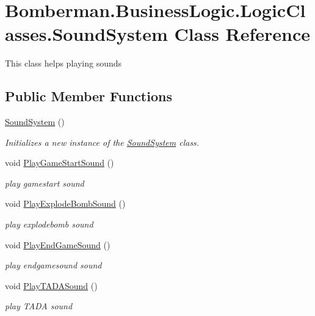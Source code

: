 \hypertarget{class_bomberman_1_1_business_logic_1_1_logic_classes_1_1_sound_system}{}\section{Bomberman.\+Business\+Logic.\+Logic\+Classes.\+Sound\+System Class Reference}
\label{class_bomberman_1_1_business_logic_1_1_logic_classes_1_1_sound_system}


This class helps playing sounds  


\subsection*{Public Member Functions}
\begin{DoxyCompactItemize}
\item 
\mbox{\hyperlink{class_bomberman_1_1_business_logic_1_1_logic_classes_1_1_sound_system_a049e84ea395402b05bea4544883a6d4b}{Sound\+System}} ()
\begin{DoxyCompactList}\small\item\em Initializes a new instance of the \mbox{\hyperlink{class_bomberman_1_1_business_logic_1_1_logic_classes_1_1_sound_system}{Sound\+System}} class. \end{DoxyCompactList}\item 
void \mbox{\hyperlink{class_bomberman_1_1_business_logic_1_1_logic_classes_1_1_sound_system_a36a73f0e17b777f416b0d655e6c062f0}{Play\+Game\+Start\+Sound}} ()
\begin{DoxyCompactList}\small\item\em play gamestart sound \end{DoxyCompactList}\item 
void \mbox{\hyperlink{class_bomberman_1_1_business_logic_1_1_logic_classes_1_1_sound_system_a8b166cb9815174d8d2a69be0f8292486}{Play\+Explode\+Bomb\+Sound}} ()
\begin{DoxyCompactList}\small\item\em play explodebomb sound \end{DoxyCompactList}\item 
void \mbox{\hyperlink{class_bomberman_1_1_business_logic_1_1_logic_classes_1_1_sound_system_a68d383e0850466cf1e9343e988c3af3e}{Play\+End\+Game\+Sound}} ()
\begin{DoxyCompactList}\small\item\em play endgamesound sound \end{DoxyCompactList}\item 
void \mbox{\hyperlink{class_bomberman_1_1_business_logic_1_1_logic_classes_1_1_sound_system_a754b631c572e32c773c22ddb8ff12fcb}{Play\+T\+A\+D\+A\+Sound}} ()
\begin{DoxyCompactList}\small\item\em play T\+A\+DA sound \end{DoxyCompactList}\end{DoxyCompactItemize}
